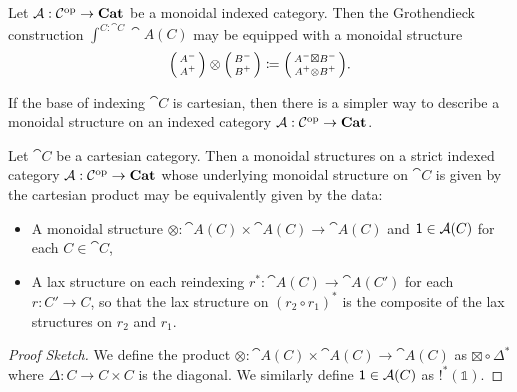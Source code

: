 \documentclass[DynamicalBook]{subfiles}
\begin{document}
\begin{theorem}\label{thm.monoidal_indexed}
Let $\mathcal{A} : \mathcal{C}^{\textnormal{op}} \to \textbf{Cat}$ be a monoidal indexed category. Then
the Grothendieck construction $\int^{C : \cat{C}} \cat{A}(C)$ may be equipped
with a monoidal structure 
$$\lens{A^-}{A^+} \otimes \lens{B^-}{B^+} \coloneqq \lens{A^- \boxtimes B^-}{A^+
\otimes B^+}.$$
\end{theorem}

If the base of indexing $\cat{C}$ is cartesian, then there is a simpler way to
describe a monoidal structure on an indexed category $\mathcal{A} : \mathcal{C}^{\textnormal{op}} \to \textbf{Cat}$.

\begin{theorem}\label{thm.monoidal_indexed_cartesian}
Let $\cat{C}$ be a cartesian category. Then a monoidal structures on a strict indexed
category $\mathcal{A} :
\mathcal{C}^{\textnormal{op}} \to \textbf{Cat}$ whose underlying monoidal structure on $\cat{C}$ is
given by the cartesian product may be equivalently given by the data:
\begin{itemize}
  \item A monoidal structure $\otimes : \cat{A}(C) \times \cat{A}(C) \to
    \cat{A}(C)$ and $\mathsf{1} \in \mathcal{A}(C)$ for each $C \in \cat{C}$, 
  \item A lax structure on each reindexing $r^{\ast} : \cat{A}(C) \to \cat{A}(C')$
    for each $r : C' \to C$, so that the lax structure on $(r_2 \circ
    r_1)^{\ast}$ is the composite of the lax structures on $r_2$ and $r_1$.
\end{itemize}
\end{theorem}
\begin{proof}[Proof Sketch]
We define the product $\otimes : \cat{A}(C) \times \cat{A}(C) \to \cat{A}(C)$ as
$\boxtimes \circ \Delta^{\ast}$ where $\Delta : C \to C \times C$ is the
diagonal. We similarly define $\mathsf{1} \in \mathcal{A}(C)$ as $!^{\ast}(\mathbb{1})$.
\end{proof}
\end{document}
